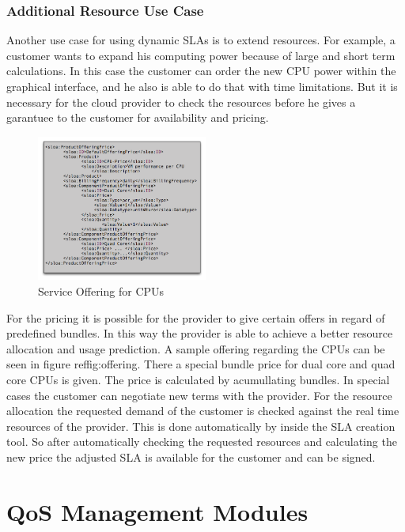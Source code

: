 \subsubsection{Additional Resource Use Case}
Another use case for using dynamic SLAs is to extend resources. For example, a customer wants to expand his computing power because of large and short term calculations. In this case the customer can order the new CPU power within the graphical interface, and he also is able to do that with time limitations. But it is necessary for the cloud provider to check the resources before he gives a garantuee to the customer for availability and pricing. 

\begin{figure}[ht]
\includegraphics[width=0.5\textwidth]{fig/offering.png}
\caption{Service Offering for CPUs}
\label{fig:offering}
\end{figure}

For the pricing it is possible for the provider to give certain offers in regard of predefined bundles. In this way the provider is able to achieve a better resource allocation and usage prediction. A sample offering regarding the CPUs can be seen in figure ref{fig:offering}. There a special bundle price for dual core and quad core CPUs is given. The price is calculated by acumullating bundles. In special cases the customer can negotiate new terms with the provider. For the resource allocation the requested demand of the customer is checked against the real time resources of the provider. This is done automatically by inside the SLA creation tool. So after automatically checking the requested resources and calculating the new price the adjusted SLA is available for the customer and can be signed.


\section{QoS Management Modules}
